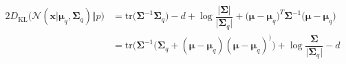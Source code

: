 \documentclass[14pt, a4paper]{article}
\numberwithin{equation}{section}
\numberwithin{figure}{section}
\numberwithin{dl}{section}
\numberwithin{md}{section}
\numberwithin{bd}{section}
\numberwithin{dn}{section}
\numberwithin{hq}{section}
\begin{document}
    \begin{equation}
        \begin{aligned}
            2 D_{\mathrm{KL}} \big( \mathcal{N}(\boldsymbol{x} \vert \boldsymbol{\mu}_q, \boldsymbol{\Sigma}_q) \Vert p \big) &= \mathrm{tr} \big( \boldsymbol{\Sigma}^{-1} \boldsymbol{\Sigma}_q \big) - d + \log \dfrac{\lvert \boldsymbol{\Sigma} \rvert}{\lvert \boldsymbol{\Sigma}_q \rvert} + \big( \boldsymbol{\mu} - \boldsymbol{\mu}_q \big)^T \boldsymbol{\Sigma}^{-1} \big( \boldsymbol{\mu} - \boldsymbol{\mu}_q \big) \\
            &= \mathrm{tr} \Big( \boldsymbol{\Sigma}^{-1} \big( \boldsymbol{\Sigma}_q + (\boldsymbol{\mu} - \boldsymbol{\mu}_q) (\boldsymbol{\mu} - \boldsymbol{\mu}_q)^ \big) \Big) + \log \dfrac{\boldsymbol{\Sigma}}{\lvert \boldsymbol{\Sigma}_q \rvert} - d
        \end{aligned}
    \end{equation}
\end{document}
